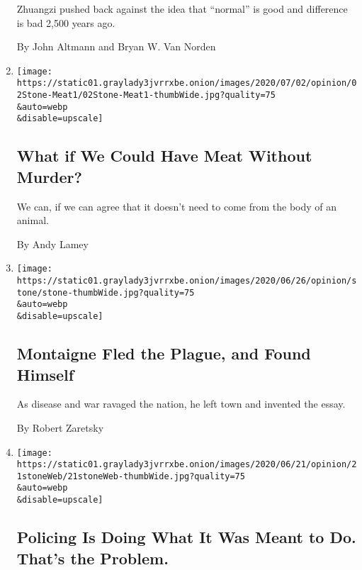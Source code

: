 \begin{enumerate}
  Zhuangzi pushed back against the idea that ``normal'' is good and
  difference is bad 2,500 years ago.

  By John Altmann and Bryan W. Van Norden
\item
  \href{/2020/07/02/opinion/lab-grown-meat.html}{}

  \texttt{[image: https://static01.graylady3jvrrxbe.onion/images/2020/07/02/opinion/02Stone-Meat1/02Stone-Meat1-thumbWide.jpg?quality=75\\\&auto=webp\\\&disable=upscale]}

  \hypertarget{what-if-we-could-have-meat-without-murder}{%
  \subsection{What if We Could Have Meat Without
  Murder?}\label{what-if-we-could-have-meat-without-murder}}

  We can, if we can agree that it doesn't need to come from the body of
  an animal.

  By Andy Lamey
\item
  \href{/2020/06/28/opinion/montaigne-plague-essays.html}{}

  \texttt{[image: https://static01.graylady3jvrrxbe.onion/images/2020/06/26/opinion/stone/stone-thumbWide.jpg?quality=75\\\&auto=webp\\\&disable=upscale]}

  \hypertarget{montaigne-fled-the-plague-and-found-himself}{%
  \subsection{Montaigne Fled the Plague, and Found
  Himself}\label{montaigne-fled-the-plague-and-found-himself}}

  As disease and war ravaged the nation, he left town and invented the
  essay.

  By Robert Zaretsky
\item
  \href{/2020/06/21/opinion/police-violence-racism-reform.html}{}

  \texttt{[image: https://static01.graylady3jvrrxbe.onion/images/2020/06/21/opinion/21stoneWeb/21stoneWeb-thumbWide.jpg?quality=75\\\&auto=webp\\\&disable=upscale]}

  \hypertarget{policing-is-doing-what-it-was-meant-to-do-thats-the-problem}{%
  \subsection{Policing Is Doing What It Was Meant to Do. That's the
  Problem.}\label{policing-is-doing-what-it-was-meant-to-do-thats-the-problem}}


\end{enumerate}
